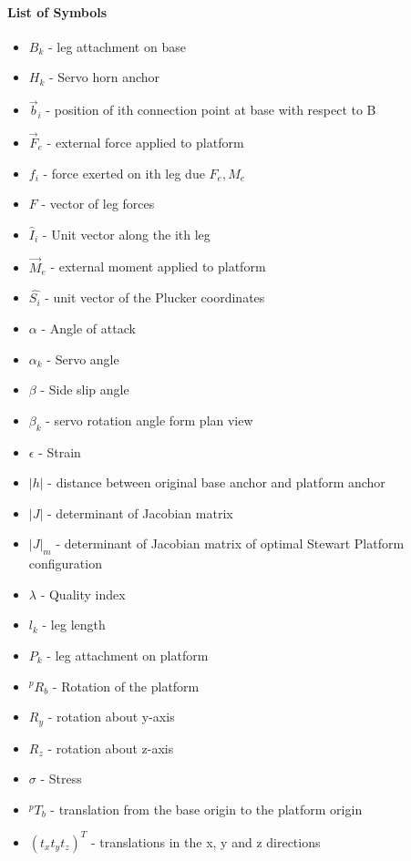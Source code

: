 \paragraph{List of Symbols}
\begin{itemize}
\item $B_{k}$ - leg attachment on base
\item $H_{k}$ - Servo horn anchor
\item $\vec{b}_i$ - position of ith connection point at base with respect to B
\item $\vec{F}_e$ - external force applied to platform
\item $f_i$ - force exerted on ith leg due $F_e, M_e$
\item $F$ - vector of leg forces
\item $\hat{I}_i$ - Unit vector along the ith leg
\item $\vec{M}_e$ - external moment applied to platform
\item $\hat{{S_{i}}}$ - unit vector of the Plucker coordinates
\item $\alpha$ - Angle of attack
\item $\alpha_{k}$ - Servo angle
\item $\beta$ - Side slip angle
\item $\beta_{k}$ - servo rotation angle form plan view
\item $\epsilon$ - Strain
\item $|h|$ - distance between original base anchor and platform anchor
\item $|J|$ - determinant of Jacobian matrix
\item $|J|_{m}$ - determinant of Jacobian matrix of optimal Stewart Platform configuration
\item $\lambda$ - Quality index
\item $l_{k}$ - leg length
\item $P_{k}$ - leg attachment on platform
\item $^{p}R_{b}$ - Rotation of the platform
\item $R_{y}$ - rotation about y-axis
\item $R_{z}$ - rotation about z-axis
\item $\sigma$ - Stress
\item $^{p}T_{b}$ - translation from the base origin to the platform origin
\item $(t_{x} t_{y} t_{z})^{T} $ -  translations in the x, y and z directions

\end{itemize}
\pagebreak